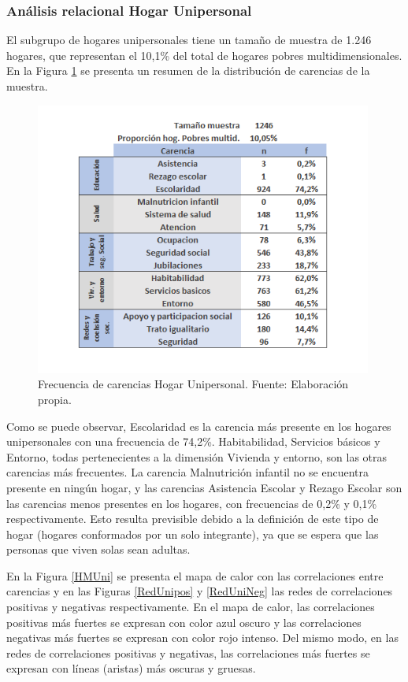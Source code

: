 \documentclass[12pt,letterpaper,spanish]{article}
\begin{document}
\subsubsection{Análisis relacional Hogar Unipersonal}
El subgrupo de hogares unipersonales tiene un tamaño de muestra de 1.246 hogares, que representan el 10,1\% del total de hogares pobres multidimensionales. En la Figura \ref{freHUni} se presenta un resumen de la distribución de carencias de la muestra.
\begin{figure}[H]
    \centering
        \includegraphics[height=9cm]{HOGARES/tabla_unip.png}
    \caption{Frecuencia de carencias Hogar Unipersonal. Fuente: Elaboración propia.}
    \label{freHUni}
\end{figure}
Como se puede observar, Escolaridad es la carencia más presente en los hogares unipersonales con una frecuencia de 74,2\%. Habitabilidad, Servicios básicos y Entorno, todas pertenecientes a la dimensión Vivienda y entorno, son las otras carencias más frecuentes. La carencia Malnutrición infantil no se encuentra presente en ningún hogar, y las carencias Asistencia Escolar y Rezago Escolar son las carencias menos presentes en los hogares, con frecuencias de 0,2\% y 0,1\% respectivamente. Esto resulta previsible debido a la definición de este tipo de hogar (hogares conformados por un solo integrante), ya que se espera que las personas que viven solas sean adultas. 

En la Figura \ref{HMUni} se presenta el mapa de calor con las correlaciones entre carencias y en las Figuras \ref{RedUnipos} y \ref{RedUniNeg} las redes de correlaciones positivas y negativas respectivamente.
En el mapa de calor, las correlaciones positivas más fuertes se expresan con color azul oscuro y las correlaciones negativas más fuertes se expresan con color rojo intenso. Del mismo modo, en las redes de correlaciones positivas y negativas, las correlaciones más fuertes se expresan con líneas (aristas) más oscuras y gruesas.
\end{document}
